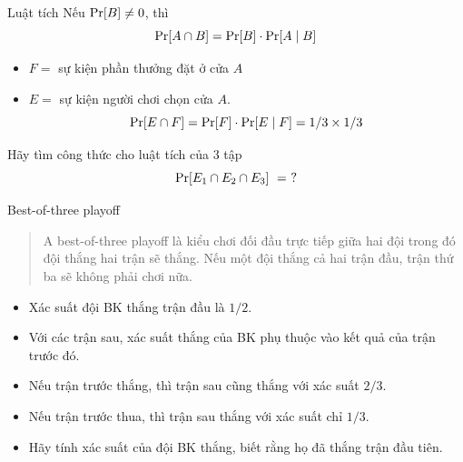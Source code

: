 \begin{frame}
  \begin{block}{Luật tích}
Nếu $\mathrm{Pr}[B] \not = 0$, thì 
    $$\mathrm{Pr} [A \cap B] = \mathrm{Pr} [B]\cdot  \mathrm{Pr}[A \mid B]$$
  \end{block}

  \begin{xmpl}
    \begin{itemize}
    \item $F = $ sự kiện phần thưởng đặt ở cửa $A$
    \item $E = $ sự kiện người chơi chọn cửa $A$.
      $$
      \mathrm{Pr} [E \cap F] = \mathrm{Pr} [F] \cdot \mathrm{Pr}[E \mid F] = 1/3 \times 1/3
      $$
    \end{itemize}     
  \end{xmpl}
\end{frame}

\begin{frame}
  \begin{xrcs}
    Hãy tìm công thức cho  luật tích của  $3$ tập
    $$
    \pr [E_1 \cap E_2 \cap E_3]\ =\ ?
    $$ 
  \end{xrcs}
\end{frame}

\begin{frame}{Best-of-three playoff}
  \begin{quotation}\color{blue!70}
    A best-of-three playoff là kiểu chơi đối đầu trực tiếp giữa hai đội trong đó đội thắng hai trận sẽ thắng. Nếu một đội thắng cả hai trận đầu, trận thứ ba sẽ không phải chơi nữa.
  \end{quotation}
\begin{itemize}
  \item Xác suất đội BK thắng trận đầu là $1/2$.
  \item Với các trận sau, xác suất thắng của BK phụ thuộc vào kết quả của trận trước đó.
  \item Nếu trận trước thắng, thì trận sau cũng thắng với xác suất $2/3$.
  \item Nếu trận trước thua, thì trận sau thắng với xác suất chỉ $1/3$.
  \item Hãy tính xác suất của đội BK thắng, biết rằng họ đã thắng trận đầu tiên.
  \end{itemize}
\end{frame}

